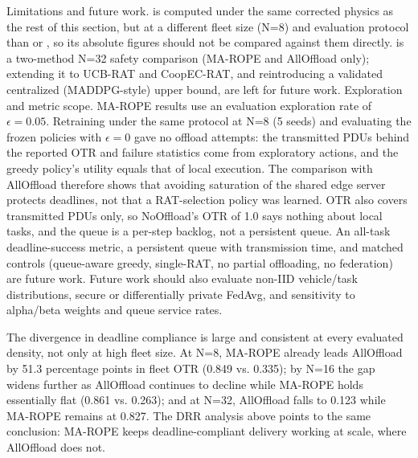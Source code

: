 Limitations and future work.  is computed under the same corrected physics as the rest of this section, but at a different fleet size (N=8) and evaluation protocol than  or , so its absolute figures should not be compared against them directly.  is a two-method N=32 safety comparison (MA-ROPE and AllOffload only); extending it to UCB-RAT and CoopEC-RAT, and reintroducing a validated centralized (MADDPG-style) upper bound, are left for future work. Exploration and metric scope. MA-ROPE results use an evaluation exploration rate of $\epsilon=0.05$. Retraining under the same protocol at N=8 (5 seeds) and evaluating the frozen policies with $\epsilon=0$ gave no offload attempts: the transmitted PDUs behind the reported OTR and failure statistics come from exploratory actions, and the greedy policy's utility equals that of local execution. The comparison with AllOffload therefore shows that avoiding saturation of the shared edge server protects deadlines, not that a RAT-selection policy was learned. OTR also covers transmitted PDUs only, so NoOffload's OTR of 1.0 says nothing about local tasks, and the queue is a per-step backlog, not a persistent queue. An all-task deadline-success metric, a persistent queue with transmission time, and matched controls (queue-aware greedy, single-RAT, no partial offloading, no federation) are future work. Future work should also evaluate non-IID vehicle/task distributions, secure or differentially private FedAvg, and sensitivity to alpha/beta weights and queue service rates.



The divergence in deadline compliance is large and consistent at every evaluated density, not only at high fleet size. At N=8, MA-ROPE already leads AllOffload by 51.3 percentage points in fleet OTR (0.849 vs. 0.335); by N=16 the gap widens further as AllOffload continues to decline while MA-ROPE holds essentially flat (0.861 vs. 0.263); and at N=32, AllOffload falls to 0.123 while MA-ROPE remains at 0.827. The DRR analysis above points to the same conclusion: MA-ROPE keeps deadline-compliant delivery working at scale, where AllOffload does not.
